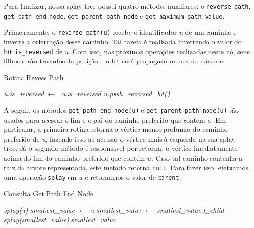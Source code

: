 Para finalizar, nossa splay tree possui quatro métodos auxiliares: o \texttt{reverse\_path}, \texttt{get\_path\_end\_node}, \texttt{get\_parent\_path\_node} e \texttt{get\_maximum\_path\_value}.

Primeiramente, o \texttt{reverse\_path(u)} recebe o identificador $u$ de um caminho e inverte a orientação desse caminho. Tal tarefa é realizada invertendo o valor do bit \texttt{is\_reversed} de $u$. Com isso, nas próximas operações realizadas neste nó, seus filhos serão trocados de posição e o bit será propagado na sua sub-árvore.

\begin{algorithm}[h!]
    \caption{Rotina Revese Path}\label{splay:reverse-path}
    \begin{algorithmic}[1]
        \State \emph{u.is\_reversed $\gets \neg$u.is\_reversed}
        \State \emph{u.push\_reversed\_bit()} 
        \EndFunction
    \end{algorithmic}
\end{algorithm}

A seguir, os métodos \texttt{get\_path\_end\_node(u)} e \texttt{get\_parent\_path\_node(u)} são usados para acessar o fim e o pai do caminho preferido que contém $u$. Em particular, a primeira rotina retorna o vértice menos profundo do caminho preferido de $u$, fazendo isso ao acessar o vértice mais à esquerda na sua splay tree. Já o segundo método é responsável por retornar o vértice imediatamente acima do fim do caminho preferido que contém $u$. Caso tal caminho contenha a raiz da árvore representada, este método retorna \texttt{null}. Para fazer isso, efetuamos uma operação \texttt{splay} em $u$ e retornamos o valor de \texttt{parent}.

\begin{algorithm}[h!]
    \caption{Consulta Get Path End Node}\label{splay:get-path-end}
    \begin{algorithmic}[1]
        \State \emph{splay(u)}
        \State \emph{smallest\_value $\gets$ u}
        \State \emph{smallest\_value $\gets$ smallest\_value.l\_child}
        \EndWhile
        \State \emph{splay(smallest\_value)}
        \State \Return \emph{smallest\_value}
        \EndFunction
    \end{algorithmic}
\end{algorithm}

